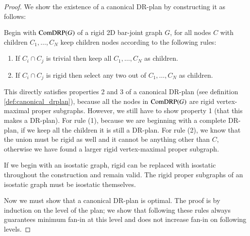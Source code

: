 \begin{proof}
We show the existence of a canonical DR-plan by constructing it as follows:

Begin with $\text{ComDRP}(G)$ of a rigid 2D bar-joint graph $G$, for all nodes $C$
with children $C_1,\ldots,C_N$ keep children nodes according to the following rules:
\begin{enumerate}
   \item If $C_i \cap C_j$ is trivial then keep all $C_1,\ldots,C_N$ as children.
   \item If $C_i \cap C_j$ is rigid then select any two out of $C_1,\ldots,C_N$ as children.
\end{enumerate}

This directly satisfies properties 2 and 3 of a canonical DR-plan (see definition \ref{def:canonical_drplan}), because all the nodes in $\text{ComDRP}(G)$ are rigid vertex-maximal proper subgraphs. However, we still have to show property 1 (that this makes a DR-plan).
For rule (1), because we are beginning with a complete DR-plan, if we keep all the children it is still a DR-plan. For rule (2), we know that the union must be rigid as well and it cannot be anything other than $C$, otherwise we have found a larger rigid vertex-maximal proper subgraph.

If we begin with an isostatic graph, rigid can be replaced with isostatic throughout the construction and remain valid. The rigid proper subgraphs of an isostatic graph must be isostatic themselves.

Now we must show that a canonical DR-plan is optimal. The proof is by induction on the level of the plan; we show that following these rules always guarantees minimum fan-in at this level and does not increase fan-in on following levels.









\end{proof}
